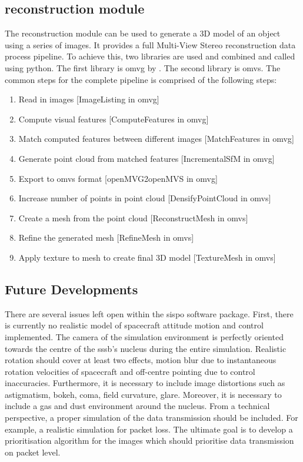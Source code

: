 \subsection{reconstruction module}
The reconstruction module can be used to generate a 3D model of an object using a series of images. It provides a full Multi-View Stereo reconstruction data process pipeline. To achieve this, two libraries are used and combined and called using python. The first library is \gls{omvg} by \cite{openMVG}. The second library is \gls{omvs}. 
The common steps for the complete pipeline is comprised of the following steps:
\begin{enumerate}
    \item Read in images [ImageListing in \gls{omvg}]
    \item Compute visual features [ComputeFeatures in \gls{omvg}]
    \item Match computed features between different images [MatchFeatures in \gls{omvg}]
    \item Generate point cloud from matched features [IncrementalSfM in \gls{omvg}]
    \item Export to \gls{omvs} format [openMVG2openMVS in \gls{omvg}]
    \item Increase number of points in point cloud [DensifyPointCloud in \gls{omvs}]
    \item Create a mesh from the point cloud [ReconstructMesh in \gls{omvs}]
    \item Refine the generated mesh [RefineMesh in \gls{omvs}]
    \item Apply texture to mesh to create final 3D model [TextureMesh in \gls{omvs}]
\end{enumerate}


\subsection{Future Developments}
There are several issues left open within the \gls{sispo} software package. First, there is currently no realistic model of spacecraft attitude motion and control implemented. The camera of the simulation environment is perfectly oriented towards the centre of the \gls{sssb}'s nucleus during the entire simulation. Realistic rotation should cover at least two effects, motion blur due to instantaneous rotation velocities of spacecraft and off-centre pointing due to control inaccuracies. Furthermore, it is necessary to include  image distortions such as astigmatism, bokeh, coma, field curvature, glare. Moreover, it is necessary to include a gas and dust environment around the nucleus. From a technical perspective, a proper simulation of the data transmission should be included. For example, a realistic simulation for packet loss. The ultimate goal is to develop a prioritisation algorithm for the images which should prioritise data transmission on packet level.